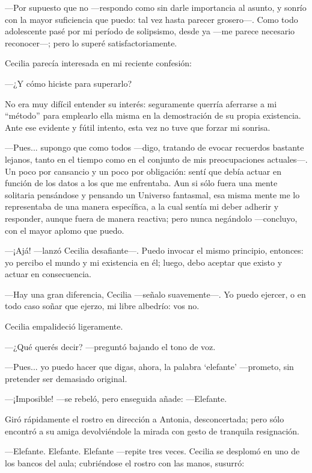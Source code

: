 ---Por supuesto que no ---respondo como sin darle importancia al
asunto, y sonrío con la mayor suficiencia que puedo: tal vez hasta
parecer grosero---. Como todo adolescente pasé por mi período de
solipsismo, desde ya ---me parece necesario re\-co\-no\-\mbox{cer---;}
pero lo superé satisfactoriamente.

Cecilia parecía interesada en mi reciente confesión:

---¿Y cómo hiciste para superarlo?

No era muy difícil entender su interés: seguramente querría aferrarse
a mi ``método'' para emplearlo ella misma en la demostración de su
propia existencia. Ante ese evidente y fútil intento, esta vez no tuve
que forzar mi sonrisa.

---Pues... supongo que como todos ---digo, tratando de evocar
recuerdos bastante lejanos, tanto en el tiempo como en el conjunto de
mis preocupaciones actuales---. Un poco por cansancio y un poco por
obligación: sentí que debía actuar en función de los datos a los que
me enfrentaba. Aun si sólo fuera una mente solitaria pensándose y
pensando un Universo fantasmal, esa misma mente me lo representaba de
una manera específica, a la cual sentía mi deber adherir y responder,
aunque fuera de manera reactiva; pero nunca negándolo ---concluyo, con
el mayor aplomo que puedo.

---¡Ajá! ---lanzó Cecilia desafiante---. Puedo invocar el mismo
principio, entonces: yo percibo el mundo y mi existencia en él; luego,
debo aceptar que existo y actuar en consecuencia.

---Hay una gran diferencia, Cecilia ---señalo sua\-ve\-men\-te---.  Yo puedo
ejercer, o en todo caso soñar que ejerzo, mi libre albedrío: vos no.

Cecilia empalideció ligeramente.

---¿Qué querés decir?  ---preguntó bajando el tono de voz.

---Pues... yo puedo hacer que digas, ahora, la palabra `elefante'
---prometo, sin pretender ser demasiado original.

---¡Imposible! ---se rebeló, pero enseguida añade: ---E\-le\-fan\-te.

Giró rápidamente el rostro en dirección a Antonia, desconcertada; pero
sólo encontró a su amiga devolviéndole la mirada con gesto de
tranquila resignación.

---Elefante. Elefante. Elefante ---repite tres veces. Cecilia se
desplomó en uno de los bancos del aula; cubriéndose el rostro con las
manos, susurró:

